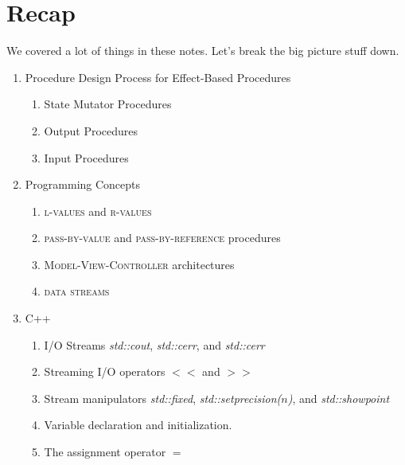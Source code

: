 \documentclass[]{tufte-handout}
\begin{document}
\section{Recap}

We covered a lot of things in these notes. Let's break the big picture stuff down.
\begin{enumerate}
\item Procedure Design Process for Effect-Based Procedures
\begin{enumerate}
\item State Mutator Procedures
\item Output Procedures
\item Input Procedures
\end{enumerate}
\item Programming Concepts
\begin{enumerate}
\item \textsc{l-values} and \textsc{r-values}
\item \textsc{pass-by-value} and \textsc{pass-by-reference} procedures
\item \textsc{Model-View-Controller} architectures
\item \textsc{data streams}
\end{enumerate}
\item C++
\begin{enumerate}
\item I/O Streams \textit{std::cout}, \textit{std::cerr}, and \textit{std::cerr}
\item Streaming I/O operators $<<$  and $>>$
\item Stream manipulators \textit{std::fixed}, \textit{std::setprecision($n$)}, and \textit{std::showpoint}
\item Variable declaration and initialization.
\item The assignment operator $=$
\end{enumerate}
\end{enumerate}
\end{document}
